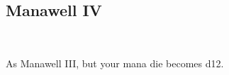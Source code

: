 \subsection*{Manawell IV}\label{feat:manawell4}
 \\

As Manawell III, but your mana die becomes d12.
